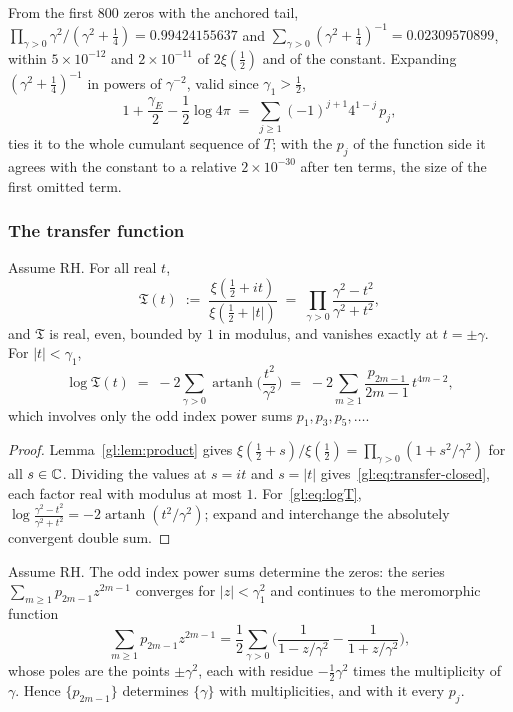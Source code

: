 From the first $800$ zeros with the anchored tail, $\prod_{\gamma>0}\gamma^2/(\gamma^2+\tfrac14) = 0.99424155637$ and $\sum_{\gamma>0}(\gamma^2+\tfrac14)^{-1}=0.02309570899$, within $5\times10^{-12}$ and $2\times10^{-11}$ of $2\xi(\tfrac12)$ and of the constant. Expanding $(\gamma^2+\tfrac14)^{-1}$ in powers of $\gamma^{-2}$, valid since $\gamma_1>\tfrac12$,
\begin{equation}\label{gl:eq:classical-series}
1+\frac{\gamma_E}{2}-\frac12\log4\pi \;=\; \sum_{j\ge1}(-1)^{j+1}4^{1-j}\,p_j,
\end{equation}
ties it to the whole cumulant sequence of $T$; with the $p_j$ of the function side it agrees with the constant to a relative $2\times10^{-30}$ after ten terms, the size of the first omitted term.

\subsubsection{The transfer function}

\begin{proposition}\label{gl:prop:transfer}
Assume RH. For all real $t$,
\begin{equation}\label{gl:eq:transfer-closed}
\mathfrak T(t) \;:=\; \frac{\xi(\tfrac12+it)}{\xi(\tfrac12+|t|)} \;=\; \prod_{\gamma>0}\frac{\gamma^2-t^2}{\gamma^2+t^2},
\end{equation}
and $\mathfrak T$ is real, even, bounded by $1$ in modulus, and vanishes exactly at $t=\pm\gamma$. For $|t|<\gamma_1$,
\begin{equation}\label{gl:eq:logT}
\log \mathfrak T(t) \;=\; -2\sum_{\gamma>0}\operatorname{artanh}\!\Big(\frac{t^2}{\gamma^2}\Big) \;=\; -2\sum_{m\ge1}\frac{p_{2m-1}}{2m-1}\,t^{4m-2},
\end{equation}
which involves only the odd index power sums $p_1,p_3,p_5,\dots$.
\end{proposition}

\begin{proof}
Lemma~\ref{gl:lem:product} gives $\xi(\tfrac12+s)/\xi(\tfrac12) = \prod_{\gamma>0}(1+s^2/\gamma^2)$ for all $s\in\mathbb{C}$. Dividing the values at $s=it$ and $s=|t|$ gives~\eqref{gl:eq:transfer-closed}, each factor real with modulus at most $1$. For~\eqref{gl:eq:logT}, $\log\frac{\gamma^2-t^2}{\gamma^2+t^2}=-2\operatorname{artanh}(t^2/\gamma^2)$; expand and interchange the absolutely convergent double sum.
\end{proof}

\begin{proposition}\label{gl:prop:odd}
Assume RH. The odd index power sums determine the zeros: the series $\sum_{m\ge1}p_{2m-1}z^{2m-1}$ converges for $|z|<\gamma_1^2$ and continues to the meromorphic function
\[
\sum_{m\ge1}p_{2m-1}z^{2m-1}=\frac12\sum_{\gamma>0}\Big(\frac{1}{1-z/\gamma^2}-\frac{1}{1+z/\gamma^2}\Big),
\]
whose poles are the points $\pm\gamma^2$, each with residue $-\tfrac12\gamma^2$ times the multiplicity of $\gamma$. Hence $\{p_{2m-1}\}$ determines $\{\gamma\}$ with multiplicities, and with it every $p_j$.
\end{proposition}

